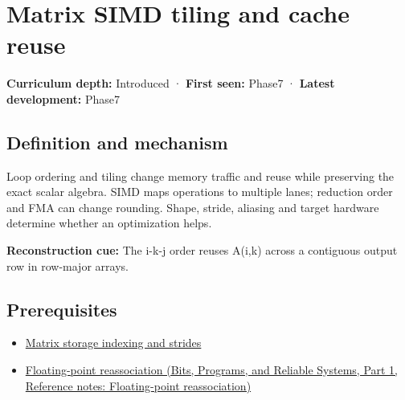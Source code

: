 \hypertarget{appendix-1bfb7c657105}{}\label{referencestart:appendix-1bfb7c657105}
\section{Matrix SIMD tiling and cache reuse}\label{appendix-1bfb7c657105-matrix-simd-tiling-and-cache-reuse}

\hypertarget{appendix-1bfb7c657105-matrix-simd-tiling-and-cache-reuse}{}

\textbf{Curriculum depth:} Introduced · \textbf{First seen:} Phase7 · \textbf{Latest development:} Phase7

\begin{allmightroledefinition}

\subsection{Definition and mechanism}\label{appendix-1bfb7c657105-definition-and-mechanism}

\hypertarget{appendix-1bfb7c657105-definition-and-mechanism}{}

Loop ordering and tiling change memory traffic and reuse while preserving the exact scalar algebra. SIMD maps operations to multiple lanes; reduction order and FMA can change rounding. Shape, stride, aliasing and target hardware determine whether an optimization helps.

\end{allmightroledefinition}

\textbf{Reconstruction cue:} The i-k-j order reuses A(i,k) across a contiguous output row in row-major arrays.

\subsection{Prerequisites}\label{appendix-1bfb7c657105-prerequisites}

\hypertarget{appendix-1bfb7c657105-prerequisites}{}

\begin{itemize}
\tightlist
\item
  \hyperref[appendix-ffdc1d4e5350]{Matrix storage indexing and strides}
\item
  \href{../01-Bits-Programs-and-Reliable-Systems-P01/main.pdf\#nameddest=appendix-c2ac4a84c283}{Floating-point reassociation (Bits, Programs, and Reliable Systems, Part 1, Reference notes: Floating-point reassociation)}
\end{itemize}

